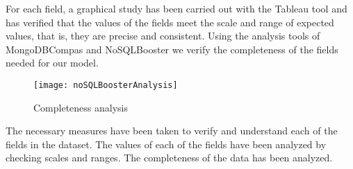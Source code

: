 For each field, a graphical study has been carried out with the Tableau tool and has verified that the values of the
fields meet the scale and range of expected values, that is, they are precise and consistent.
Using the analysis tools of MongoDBCompas and NoSQLBooster we verify the completeness of the fields needed for our model.
\begin{figure}[ht]
    \centering
    \texttt{[image: noSQLBoosterAnalysis]}
    \caption{Completeness analysis}
\end{figure}

\begin{itemize}
    \done The necessary measures have been taken to verify and understand each of the fields in the dataset.
    \done The values of each of the fields have been analyzed by checking scales and ranges.
    \done The completeness of the data has been analyzed.
    
\end{itemize}
 \newpage